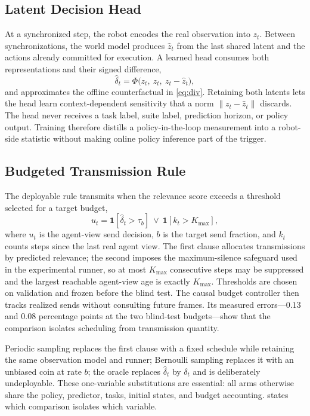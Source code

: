 \documentclass[sigconf,10pt,anonymous,review]{acmart}
\newcommand{\dt}{\delta_t}
\newcommand{\dth}{\hat{\delta}_t}
\begin{document}
\subsection{Latent Decision Head}
At a synchronized step, the robot encodes the real observation into $z_t$.
Between synchronizations, the world model produces $\hat z_t$ from the last
shared latent and the actions already committed for execution. A learned head
consumes both representations and their signed difference,
\begin{equation}
\dth = \Phi\bigl(z_t,\ \hat z_t,\ z_t-\hat z_t\bigr),
\label{eq:head}
\end{equation}
and approximates the offline counterfactual in \cref{eq:div}. Retaining both
latents lets the head learn context-dependent sensitivity that a norm
$\lVert z_t-\hat z_t\rVert$ discards. The head never receives a task label,
suite label, prediction horizon, or policy output. Training therefore
distills a policy-in-the-loop measurement into a robot-side statistic without
making online policy inference part of the trigger.

\subsection{Budgeted Transmission Rule}
The deployable rule transmits when the relevance score exceeds a threshold
selected for a target budget,
\begin{equation}
u_t = \mathbf{1}[\dth > \tau_b]\ \vee\ \mathbf{1}[k_t > K_{\max}],
\label{eq:rule}
\end{equation}
where $u_t$ is the agent-view send decision, $b$ is the target send fraction,
and $k_t$ counts steps since the last real agent view. The first clause
allocates transmissions by predicted relevance; the second imposes the
maximum-silence safeguard used in the experimental runner, so at most
$K_{\max}$ consecutive steps may be suppressed and the largest reachable
agent-view age is exactly $K_{\max}$. Thresholds are chosen on validation and
frozen before the blind test. The causal budget controller then tracks
realized sends without consulting future frames. Its measured
errors---$0.13$ and $0.08$ percentage points at the two blind-test
budgets---show that the comparison isolates scheduling from transmission quantity.

Periodic sampling replaces the first clause with a fixed schedule while
retaining the same observation model and runner; Bernoulli sampling replaces
it with an unbiased coin at rate $b$; the oracle replaces $\dth$ by $\dt$ and
is deliberately undeployable. These one-variable substitutions are essential:
all arms otherwise share the policy, predictor, tasks, initial states, and
budget accounting.  states which comparison isolates which
variable.
\end{document}
